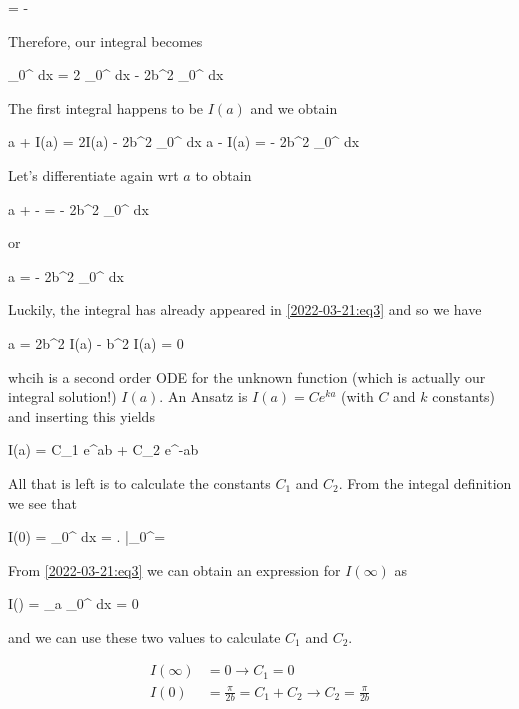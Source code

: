 \bee
{} =  - 
\eee

Therefore, our integral becomes

 \int_0^\infty {} dx = 2 \int_0^\infty {} dx - 2b^2 \int_0^\infty {} dx
\eee

The first integral happens to be $I(a)$ and we obtain

\bee
a  + I(a) = 2I(a) - 2b^2 \int_0^\infty {} dx \rightarrow a  - I(a) = - 2b^2 \int_0^\infty {} dx
\eee

Let's differentiate again wrt $a$ to obtain

\bee
a  +  -  = - 2b^2 \int_0^\infty {} dx
\eee

or

\bee
a  = - 2b^2 \int_0^\infty {} dx
\eee

Luckily, the integral has already appeared in \eqref{2022-03-21:eq3} and so we have

\bee
a  = 2b^2  I(a) \rightarrow {} - b^2 I(a) = 0
\eee

whcih is a second order ODE for the unknown function (which is actually our integral solution!) $I(a)$. An Ansatz is $I(a) = C e^{ka}$ (with $C$ and $k$ constants) and inserting this yields

\bee
I(a) = C_1 e^{ab} + C_2 e^{-ab}
\eee

All that is left is to calculate the constants $C_1$ and $C_2$. From the integal definition we see that

\bee
I(0) = \int_0^\infty {} dx =  \left. \arctan {} \right|_0^\infty = 
\eee

From \eqref{2022-03-21:eq3} we can obtain an expression for $I(\infty)$ as

\bee
I(\infty) = \lim_{a \rightarrow \infty}  \int_0^\infty {} dx = 0
\eee

and we can use these two values to calculate $C_1$ and $C_2$.

\begin{align*}
    I(\infty) &= 0 \rightarrow C_1 = 0 \\
    I(0) &= \frac{\pi}{2b} = C_1 + C_2 \rightarrow C_2 = \frac{\pi}{2b}
\end{align*}


